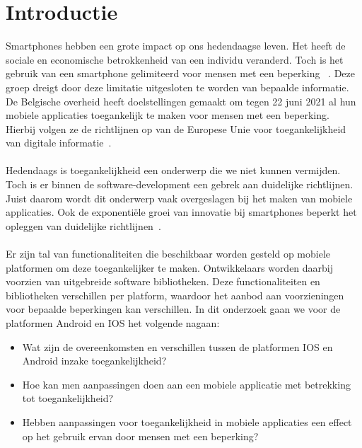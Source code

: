 
\section{Introductie} %
\label{sec:introductie}

Smartphones hebben een grote impact op ons hedendaagse leven. Het heeft de sociale en economische betrokkenheid van een individu veranderd.  Toch is het gebruik van een smartphone gelimiteerd voor mensen met een beperking
~\autocite{morris2014wireless}. Deze groep dreigt door deze limitatie uitgesloten te worden van bepaalde informatie. De Belgische overheid heeft doelstellingen gemaakt om tegen 22 juni 2021 al hun mobiele applicaties toegankelijk te maken voor mensen met een beperking. Hierbij volgen ze de richtlijnen op van de Europese Unie voor toegankelijkheid van digitale informatie~\autocite{Knacktoegankelijkheid2018}.
\\~\\
Hedendaags is toegankelijkheid een onderwerp die we niet kunnen vermijden. Toch is er binnen de software-development een gebrek aan duidelijke richtlijnen. Juist daarom wordt dit onderwerp vaak overgeslagen bij het maken van mobiele applicaties. Ook de exponentiële groei van innovatie bij smartphones beperkt het opleggen van duidelijke richtlijnen~\autocite{diaz2014accessibility}. \\~\\ Er zijn  tal van functionaliteiten die beschikbaar worden gesteld op mobiele platformen om deze toegankelijker te maken. Ontwikkelaars worden daarbij voorzien van uitgebreide software bibliotheken. Deze functionaliteiten en bibliotheken verschillen per platform, waardoor het aanbod aan voorzieningen voor bepaalde beperkingen kan verschillen. In dit onderzoek gaan we voor de platformen Android en IOS het volgende nagaan:




\begin{itemize}
    \setlength\itemsep{0.5em}
    \item Wat zijn de overeenkomsten en verschillen tussen de platformen IOS en Android inzake toegankelijkheid?
  \item Hoe kan men aanpassingen doen aan een mobiele applicatie met betrekking tot toegankelijkheid?
  \item Hebben aanpassingen voor toegankelijkheid in mobiele applicaties een effect op het gebruik ervan door mensen met een beperking?
  
\end{itemize}

